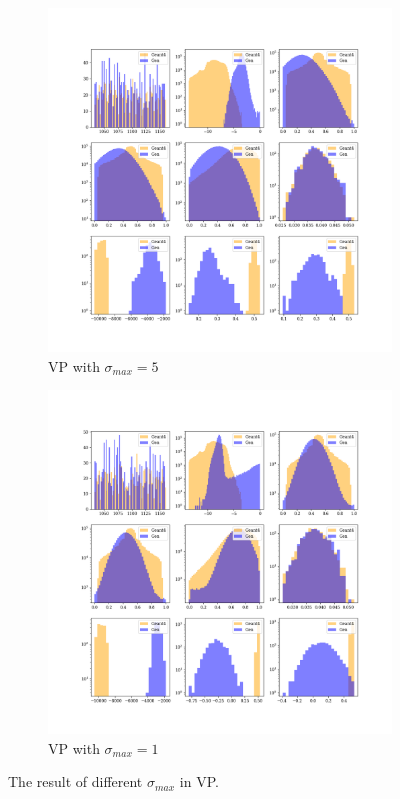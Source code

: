 \begin{figure}[htbp]
    \begin{subfigure}[b]{0.4\textwidth}
        \includegraphics[width=\textwidth]{Figures/vp_5.png}
        \caption{VP with $\sigma_{max} = 5$}
        \label{fig:vp_5}
    \end{subfigure}
    \hspace{0.015\textwidth} %
    \begin{subfigure}[b]{0.4\textwidth}
        \includegraphics[width=\textwidth]{Figures/vp_1.png}
        \caption{VP with $\sigma_{max} = 1$}
        \label{fig:vp_1}
    \end{subfigure}
    
    \caption{The result of different $\sigma_{max}$ in VP.}
    \label{fig:vp_sigma_max}
\end{figure}


